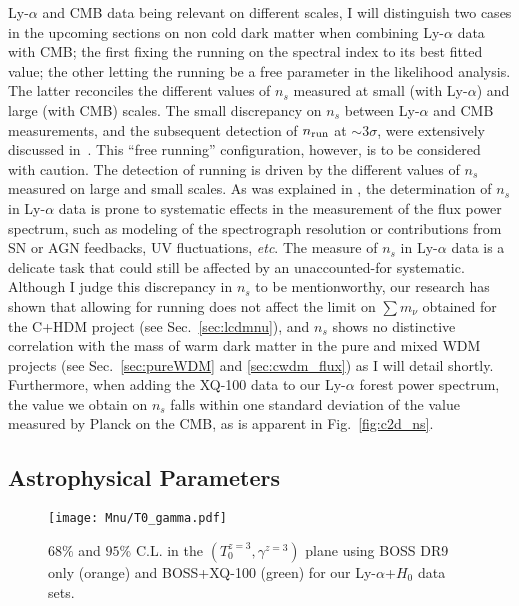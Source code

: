 Ly-$\alpha$ and CMB data being relevant on different scales, I will distinguish two cases in the upcoming sections on non cold dark matter when combining Ly-$\alpha$ data with CMB; the first fixing the running on the spectral index to its best fitted value; the other letting the running be a free parameter in the likelihood analysis. The latter reconciles the different values of $n_s$ measured at small (with Ly-$\alpha$) and large (with CMB) scales. The small discrepancy on $n_s$ between Ly-$\alpha$ and CMB measurements, and the subsequent detection of $n_{\rm run}$ at  $\sim3\sigma$, were extensively discussed in~\cite{Palanque2015b}. This ``free running'' configuration, however, is to be considered with caution. The detection of running is driven by the different values of $n_s$ measured on large and small scales. As was explained in \cite{Palanque2015b},  the determination of $n_s$ in Ly-$\alpha$ data is prone to  systematic effects in the measurement of the flux power spectrum, such as modeling of the  spectrograph resolution or contributions from SN or AGN feedbacks, UV fluctuations, \textit{etc}. The measure of $n_s$ in Ly-$\alpha$ data is  a delicate task that could still be affected by an unaccounted-for systematic. \\

Although I judge this discrepancy in $n_s$ to be mentionworthy, our research has shown that allowing for running does not affect the limit on $\sum m_\nu$ obtained for the C+HDM project (see Sec.~\ref{sec:lcdmnu}), and $n_s$ shows no distinctive correlation with the mass of warm dark matter in the pure and mixed WDM projects (see Sec.~\ref{sec:pureWDM} and \ref{sec:cwdm_flux}) as I will detail shortly. Furthermore, when adding the XQ-100 data to our Ly-$\alpha$ forest power spectrum, the value we obtain on $n_s$ falls within one standard deviation of the value measured by Planck on the CMB, as is apparent in Fig.~\ref{fig:c2d_ns}.

\subsection{Astrophysical Parameters}

\begin{figure}
\begin{center}
\texttt{[image: Mnu/T0\_gamma.pdf]}
\caption{$68\%$ and $95\%$ C.L. in the $\left( T_0^{z=3}, \gamma^{z=3} \right)$ plane using BOSS DR9 only (orange) and BOSS+XQ-100 (green) for our Ly-$\alpha$+$H_0$ data sets.}
\label{fig:c2d_igm}
\end{center}
\end{figure}

